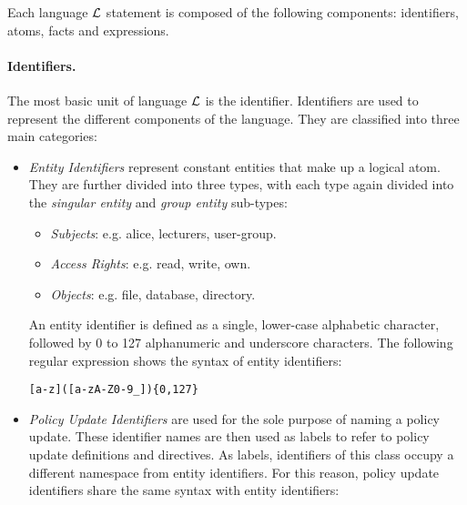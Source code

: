 \documentclass[glov2,twocolumn,final]{svjour2}
\newenvironment{vverbatim}
  {\begin{alltt}}
  {\vspace{-\baselineskip}\end{alltt}}
\begin{document}
        Each language ${\cal L}$ statement is composed of the following
        components: identifiers, atoms, facts and expressions.

        \paragraph{Identifiers.}
          The most basic unit of language $\cal{L}$ is the identifier.
          Identifiers are used to represent the different components of the
          language. They are classified into three main categories:

          \begin{itemize}
            \item
              {\em Entity Identifiers} represent constant entities that make up
              a logical atom. They are further divided into three types, with
              each type again divided into the {\em singular entity} and
              {\em group entity} sub-types:

              \begin{itemize}
                \item
                  {\em Subjects}: e.g. alice, lecturers, user-group.
                \item
                  {\em Access Rights}: e.g. read, write, own.
                \item
                  {\em Objects}: e.g. file, database, directory.
              \end{itemize}

              An entity identifier is defined as a single, lower-case
              alphabetic character, followed by 0 to 127 alphanumeric and
              underscore characters. The following regular expression shows
              the syntax of entity identifiers:

              \begin{vverbatim}
  [a-z]([a-zA-Z0-9\_])\{0,127\}
              \end{vverbatim}

            \item
              {\em Policy Update Identifiers} are used for the sole purpose of
              naming a policy update. These identifier names are then used as
              labels to refer to policy update definitions and directives. As
              labels, identifiers of this class occupy a different namespace
              from entity identifiers. For this reason, policy update
              identifiers share the same syntax with entity identifiers:



\end{itemize}
\end{document}
